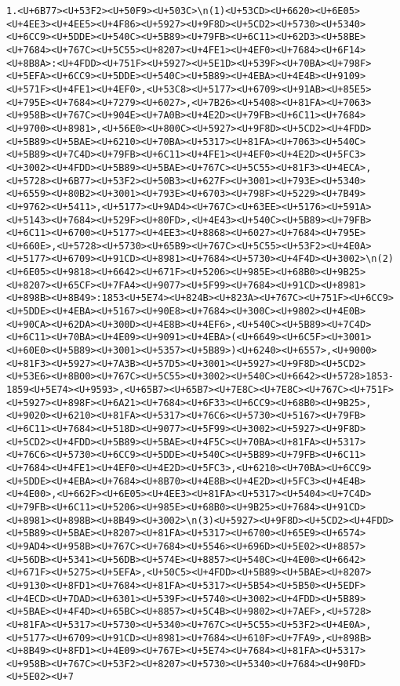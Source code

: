 \documentclass[
]{article}
\begin{document}
\begin{verbatim}
1.<U+6B77><U+53F2><U+50F9><U+503C>\n(1)<U+53CD><U+6620><U+6E05><U+4EE3><U+4EE5><U+4F86><U+5927><U+9F8D><U+5CD2><U+5730><U+5340><U+6CC9><U+5DDE><U+540C><U+5B89><U+79FB><U+6C11><U+62D3><U+58BE><U+7684><U+767C><U+5C55><U+8207><U+4FE1><U+4EF0><U+7684><U+6F14><U+8B8A>:<U+4FDD><U+751F><U+5927><U+5E1D><U+539F><U+70BA><U+798F><U+5EFA><U+6CC9><U+5DDE><U+540C><U+5B89><U+4EBA><U+4E4B><U+9109><U+571F><U+4FE1><U+4EF0>,<U+53C8><U+5177><U+6709><U+91AB><U+85E5><U+795E><U+7684><U+7279><U+6027>,<U+7B26><U+5408><U+81FA><U+7063><U+958B><U+767C><U+904E><U+7A0B><U+4E2D><U+79FB><U+6C11><U+7684><U+9700><U+8981>,<U+56E0><U+800C><U+5927><U+9F8D><U+5CD2><U+4FDD><U+5B89><U+5BAE><U+6210><U+70BA><U+5317><U+81FA><U+7063><U+540C><U+5B89><U+7C4D><U+79FB><U+6C11><U+4FE1><U+4EF0><U+4E2D><U+5FC3><U+3002><U+4FDD><U+5B89><U+5BAE><U+767C><U+5C55><U+81F3><U+4ECA>,<U+5728><U+6B77><U+53F2><U+50B3><U+627F><U+3001><U+793E><U+5340><U+6559><U+80B2><U+3001><U+793E><U+6703><U+798F><U+5229><U+7B49><U+9762><U+5411>,<U+5177><U+9AD4><U+767C><U+63EE><U+5176><U+591A><U+5143><U+7684><U+529F><U+80FD>,<U+4E43><U+540C><U+5B89><U+79FB><U+6C11><U+6700><U+5177><U+4EE3><U+8868><U+6027><U+7684><U+795E><U+660E>,<U+5728><U+5730><U+65B9><U+767C><U+5C55><U+53F2><U+4E0A><U+5177><U+6709><U+91CD><U+8981><U+7684><U+5730><U+4F4D><U+3002>\n(2)<U+6E05><U+9818><U+6642><U+671F><U+5206><U+985E><U+68B0><U+9B25><U+8207><U+65CF><U+7FA4><U+9077><U+5F99><U+7684><U+91CD><U+8981><U+898B><U+8B49>:1853<U+5E74><U+824B><U+823A><U+767C><U+751F><U+6CC9><U+5DDE><U+4EBA><U+5167><U+90E8><U+7684><U+300C><U+9802><U+4E0B><U+90CA><U+62DA><U+300D><U+4E8B><U+4EF6>,<U+540C><U+5B89><U+7C4D><U+6C11><U+70BA><U+4E09><U+9091><U+4EBA>(<U+6649><U+6C5F><U+3001><U+60E0><U+5B89><U+3001><U+5357><U+5B89>)<U+6240><U+6557>,<U+9000><U+81F3><U+5927><U+7A3B><U+57D5><U+3001><U+5927><U+9F8D><U+5CD2><U+53E6><U+8B00><U+767C><U+5C55><U+3002><U+540C><U+6642><U+5728>1853-1859<U+5E74><U+9593>,<U+65B7><U+65B7><U+7E8C><U+7E8C><U+767C><U+751F><U+5927><U+898F><U+6A21><U+7684><U+6F33><U+6CC9><U+68B0><U+9B25>,<U+9020><U+6210><U+81FA><U+5317><U+76C6><U+5730><U+5167><U+79FB><U+6C11><U+7684><U+518D><U+9077><U+5F99><U+3002><U+5927><U+9F8D><U+5CD2><U+4FDD><U+5B89><U+5BAE><U+4F5C><U+70BA><U+81FA><U+5317><U+76C6><U+5730><U+6CC9><U+5DDE><U+540C><U+5B89><U+79FB><U+6C11><U+7684><U+4FE1><U+4EF0><U+4E2D><U+5FC3>,<U+6210><U+70BA><U+6CC9><U+5DDE><U+4EBA><U+7684><U+8B70><U+4E8B><U+4E2D><U+5FC3><U+4E4B><U+4E00>,<U+662F><U+6E05><U+4EE3><U+81FA><U+5317><U+5404><U+7C4D><U+79FB><U+6C11><U+5206><U+985E><U+68B0><U+9B25><U+7684><U+91CD><U+8981><U+898B><U+8B49><U+3002>\n(3)<U+5927><U+9F8D><U+5CD2><U+4FDD><U+5B89><U+5BAE><U+8207><U+81FA><U+5317><U+6700><U+65E9><U+6574><U+9AD4><U+958B><U+767C><U+7684><U+5546><U+696D><U+5E02><U+8857><U+56DB><U+5341><U+56DB><U+574E><U+8857><U+540C><U+4E00><U+6642><U+671F><U+5275><U+5EFA>,<U+50C5><U+4FDD><U+5B89><U+5BAE><U+8207><U+9130><U+8FD1><U+7684><U+81FA><U+5317><U+5B54><U+5B50><U+5EDF><U+4ECD><U+7DAD><U+6301><U+539F><U+5740><U+3002><U+4FDD><U+5B89><U+5BAE><U+4F4D><U+65BC><U+8857><U+5C4B><U+9802><U+7AEF>,<U+5728><U+81FA><U+5317><U+5730><U+5340><U+767C><U+5C55><U+53F2><U+4E0A>,<U+5177><U+6709><U+91CD><U+8981><U+7684><U+610F><U+7FA9>,<U+898B><U+8B49><U+8FD1><U+4E09><U+767E><U+5E74><U+7684><U+81FA><U+5317><U+958B><U+767C><U+53F2><U+8207><U+5730><U+5340><U+7684><U+90FD><U+5E02><U+7
\end{verbatim}
\end{document}
